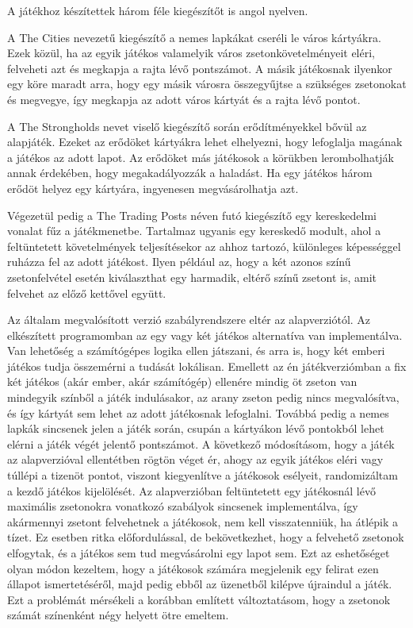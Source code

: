 
A játékhoz készítettek három féle kiegészítőt is angol nyelven.

A The Cities nevezetű kiegészítő a nemes lapkákat cseréli le város kártyákra. Ezek közül, ha az egyik játékos valamelyik város zsetonkövetelményeit eléri, felveheti azt és megkapja a rajta lévő pontszámot. A másik játékosnak ilyenkor egy köre maradt arra, hogy egy másik városra összegyűjtse a szükséges zsetonokat és megvegye, így megkapja az adott város kártyát és a rajta lévő pontot.

A The Strongholds nevet viselő kiegészítő során erődítményekkel bővül az alapjáték. Ezeket az erődöket kártyákra lehet elhelyezni, hogy lefoglalja magának a játékos az adott lapot. Az erődöket más játékosok a körükben lerombolhatják annak érdekében, hogy megakadályozzák a haladást. Ha egy játékos három erődöt helyez egy kártyára, ingyenesen megvásárolhatja azt.

Végezetül pedig a  The Trading Posts néven futó kiegészítő egy kereskedelmi vonalat fűz a játékmenetbe. Tartalmaz ugyanis egy kereskedő modult, ahol a feltüntetett követelmények teljesítésekor az ahhoz tartozó, különleges képességgel ruházza fel az adott játékost. Ilyen például az, hogy a két azonos színű zsetonfelvétel esetén kiválaszthat egy harmadik, eltérő színű zsetont is, amit felvehet az előző kettővel együtt.


Az általam megvalósított verzió szabályrendszere eltér az alapverziótól. Az elkészített programomban az egy vagy két játékos alternatíva van implementálva. Van lehetőség a számítógépes logika ellen játszani, és arra is, hogy két emberi játékos tudja összemérni a tudását lokálisan. Emellett az én játékverziómban a fix két játékos (akár ember, akár számítógép) ellenére mindig öt zseton van mindegyik színből a játék indulásakor, az arany zseton pedig nincs megvalósítva, és így kártyát sem lehet az adott játékosnak lefoglalni. Továbbá pedig a nemes lapkák sincsenek jelen a játék során, csupán a kártyákon lévő pontokból lehet elérni a játék végét jelentő pontszámot. A következő módosításom, hogy a játék az alapverzióval ellentétben rögtön véget ér, ahogy az egyik játékos eléri vagy túllépi a tizenöt pontot, viszont kiegyenlítve a játékosok esélyeit, randomizáltam a kezdő játékos kijelölését. Az alapverzióban feltüntetett egy játékosnál lévő maximális zsetonokra vonatkozó szabályok sincsenek implementálva, így akármennyi zsetont felvehetnek a játékosok, nem kell visszatenniük, ha átlépik a tízet. Ez esetben ritka előfordulással, de bekövetkezhet, hogy a felvehető zsetonok elfogytak, és a játékos sem tud megvásárolni egy lapot sem. Ezt az eshetőséget olyan módon kezeltem, hogy a játékosok számára megjelenik egy felirat ezen állapot ismertetéséről, majd pedig ebből az üzenetből kilépve újraindul a játék. Ezt a problémát mérsékeli a korábban említett változtatásom, hogy a zsetonok számát színenként négy helyett ötre emeltem. 

